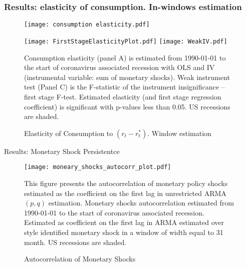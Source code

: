 \documentclass[11pt,pdf,aspectratio=129]{beamer}
\begin{document}
\begin{frame}\frametitle{Results: elasticity of consumption. In-windows estimation}

    \begin{figure}[ht]\centering
        \begin{minipage}{0.74\textwidth}
            \caption{Elasticity of Consumption to $(r_t-r_t^*)$. Window estimation}
            \label{fig:ElasticityofConsumption}
            \begin{minipage}{0.64\textwidth}
            \texttt{[image: consumption elasticity.pdf]}
            \end{minipage}
            \begin{minipage}{0.35\textwidth}
            \texttt{[image: FirstStageElasticityPlot.pdf]}
            \texttt{[image: WeakIV.pdf]}
            \end{minipage}
            {\begin{flushleft}\tiny Consumption elasticity (panel A) is estimated from 1990-01-01 to the start of coronavirus associated recession with OLS and IV (instrumental variable: sum of monetary shocks). Weak instrument test  (Panel C) is the F-statistic of the instrument insignificance -- first stage F-test.  Estimated elasticity (and first stage regression coefficient) is significant with p-values less than 0.05. US recessions are shaded. \end{flushleft}}
            \end{minipage}
    \end{figure}
\end{frame}

\begin{frame}{Results: Monetary Shock Persistentce}
    

    \begin{figure}[!htbp]\centering
        \begin{minipage}{0.6\textwidth}
            \caption{Autocorrelation of Monetary Shocks}
            \label{fig:Autocorrelation}
            \texttt{[image: moneary\_shocks\_autocorr\_plot.pdf]}
            {\begin{flushleft}\tiny This figure presents the autocorrelation of monetary policy shocks estimated as the coefficient on the first lag in unrestricted ARMA$(p,q)$ estimation. Monetary shocks autocorrelation estimated from 1990-01-01 to the start of coronavirus associated recession. Estimated as coefficient on the first lag in ARMA estimated over  style identified monetary shock in a window of width equal to 31 month. US recessions are shaded.\end{flushleft}}
            \end{minipage}
    \end{figure}

\end{frame}
\end{document}
